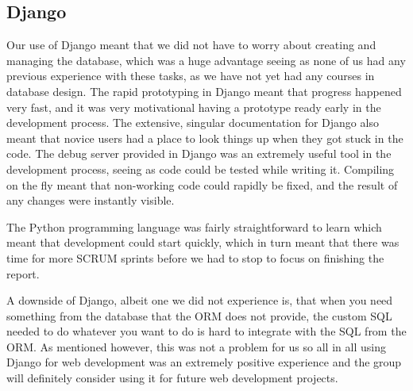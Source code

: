 \subsection{Django}
Our use of Django meant that we did not have to worry about creating and managing the database, which was a huge advantage
seeing as none of us had any previous experience with these tasks, as we have not yet had any courses in database design. The
rapid prototyping in Django meant that progress happened very fast, and it was very motivational having a prototype ready
early in the development process. The extensive, singular documentation for Django also meant that novice users had a place to look things up when they got stuck in the code. 
The debug server provided in Django was an extremely useful tool in the development process, seeing as code could be tested
while writing it. Compiling on the fly meant that non-working code could rapidly be fixed, and the result of any changes were instantly visible.

The Python programming language was fairly straightforward to learn which meant that development could start quickly, which in
turn meant that there was time for more SCRUM sprints before we had to stop to focus on finishing the report. 

A downside of Django, albeit one we did not experience is, that when you need something from the database that the ORM does not provide, the custom SQL needed to do whatever you want to do is hard to integrate with the SQL from the ORM. As mentioned however, this was not a problem for us so all in all using Django for web development was an extremely positive experience
and the group will definitely consider using it for future web development projects.